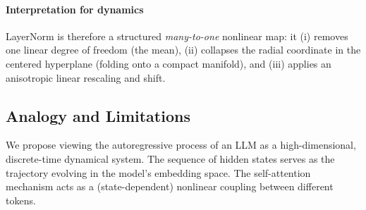\documentclass[a4paper,12pt]{article}
\begin{document}
\paragraph{Interpretation for dynamics}
\label{par:interpretation_dynamics}
\label{par:interpretation_dynamics}
LayerNorm is therefore a structured \emph{many-to-one} nonlinear map: it (i) removes one linear degree of freedom (the mean), (ii) collapses the radial coordinate in the centered hyperplane (folding onto a compact manifold), and (iii) applies an anisotropic linear rescaling and shift.


\subsection{Analogy and Limitations}
We propose viewing the autoregressive process of an LLM as a high-dimensional, discrete-time dynamical system. The sequence of hidden states serves as the trajectory evolving in the model's embedding space. The self-attention mechanism acts as a (state-dependent) nonlinear coupling between different tokens. 
\end{document}
